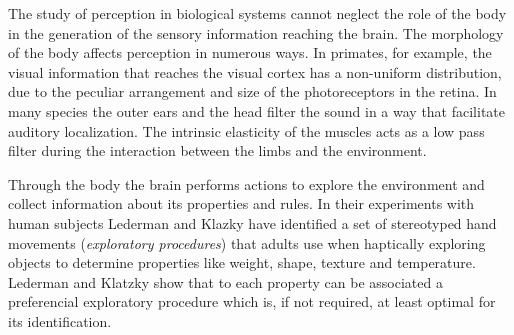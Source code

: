 
The study of perception in biological systems cannot neglect the role of the body in the generation of the sensory information reaching the brain.
The morphology of the body affects perception in numerous ways. In primates, for example, the visual information that reaches the visual cortex has a non-uniform distribution, due to the peculiar arrangement and size of the photoreceptors in the retina. In many species the outer ears and the head filter the sound in a way that facilitate auditory localization. The intrinsic elasticity of the muscles acts as a low pass filter during the interaction between the limbs and the environment.

Through the body the brain performs actions to explore the environment and collect information about its properties and rules. In their experiments with human subjects Lederman and Klazky \cite{lederman87hand} have identified a set of stereotyped hand movements ({\it exploratory procedures}) that adults use when haptically exploring objects to determine properties like weight, shape, texture and temperature. Lederman and Klatzky show that to each property can be associated a preferencial exploratory procedure which is, if not required, at least optimal for its identification. 

